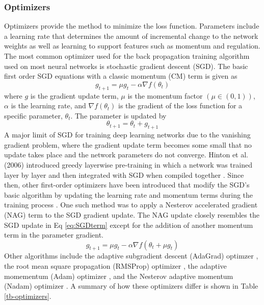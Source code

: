 \documentclass[preprint,12pt,authoryear]{elsarticle}
\begin{document}
\begin{linenumbers}
\subsubsection{Optimizers}
Optimizers provide the method to minimize the loss function. Parameters include a learning rate that determines the amount of incremental change to the network weights as well as learning to support features such as momentum and regulation. The most common optimizer used for the back propagation training algorithm used on most neural networks is stochastic gradient descent (SGD). The basic first order SGD equations with a classic momentum (CM) term is given as
%
\begin{equation}
\label{eq:SGDterm}
g_{t+1} = \mu g_{t} - \alpha \nabla f (\theta_{t})
\end{equation}
%
where $g$ is the gradient update term, $\mu$ is the momentum factor $(\mu \in (0,1))$, $\alpha$ is the learning rate, and $\nabla f (\theta_{t})$ is the gradient of the loss function for a specific parameter, $\theta_{t}$. The parameter is updated by
%
\begin{equation}
\label{eq:SGDupdate}
\theta_{t+1} = \theta_{t} + g_{t+1}
\end{equation}
%
A major limit of SGD for training deep learning networks due to the vanishing gradient problem, where the gradient update term becomes some small that no update takes place and the network parameters do not converge. Hinton et al. (2006) introduced greedy layerwise pre-training in which a network was trained layer by layer and then integrated with SGD when compiled together \citep{Hinton2006}. Since then, other first-order optimizers have been introduced that modify the SGD's basic algorithm by updating the learning rate and momentum terms during the training process \citep{Sutskever2013}.  One such method was to apply a Nesterov accelerated gradient (NAG) \citep{Nesterov1983} term to the SGD gradient update. The NAG update closely resembles the SGD update in Eq \ref{eq:SGDterm} except for the addition of another momentum term in the parameter gradient.
%
\begin{equation}
\label{eq:SGD-NAG}
g_{t+1} = \mu g_{t} - \alpha \nabla f (\theta_{t} + \mu g_{t})
\end{equation}
%
Other algorithms include the adaptive subgradient descent (AdaGrad) optimzer \citep{Duchi2011}, the root mean square propagation (RMSProp) optimizer \citep{Tieleman2012}, the adaptive momementum (Adam) optimizer \citep{Kingma2014}, and the Nesterov adaptive momentum (Nadam) optimizer \citep{Dozat2016}. A summary of how these optimizers differ is shown in Table \ref{tb-optimizers}.
%
\end{linenumbers}
\end{document}
